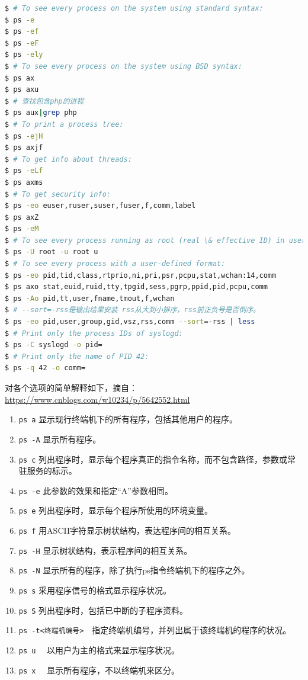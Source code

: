 \documentclass[doctor,openright,twoside]{sjtuthesis}
\providecommand{\tightlist}{%
    \setlength{\itemsep}{0pt}\setlength{\parskip}{0pt}}
\newcommand{\passthrough}[1]{#1}
\theoremstyle{plain}
\theoremstyle{definition}
\theoremstyle{remark}
\theoremstyle{ocrenumbox}
\theoremstyle{plain}
\begin{document}
\begin{lstlisting}[language=bash]
$ # To see every process on the system using standard syntax:
$ ps -e
$ ps -ef
$ ps -eF
$ ps -ely
$ # To see every process on the system using BSD syntax:
$ ps ax
$ ps axu
$ # 查找包含php的进程
$ ps aux|grep php
$ # To print a process tree:
$ ps -ejH
$ ps axjf
$ # To get info about threads:
$ ps -eLf
$ ps axms
$ # To get security info:
$ ps -eo euser,ruser,suser,fuser,f,comm,label
$ ps axZ
$ ps -eM
$ # To see every process running as root (real \& effective ID) in user format:
$ ps -U root -u root u
$ # To see every process with a user-defined format:
$ ps -eo pid,tid,class,rtprio,ni,pri,psr,pcpu,stat,wchan:14,comm
$ ps axo stat,euid,ruid,tty,tpgid,sess,pgrp,ppid,pid,pcpu,comm
$ ps -Ao pid,tt,user,fname,tmout,f,wchan
$ # --sort=-rss是输出结果安装 rss从大到小排序，rss前正负号是否倒序。
$ ps -eo pid,user,group,gid,vsz,rss,comm --sort=-rss | less
$ # Print only the process IDs of syslogd:
$ ps -C syslogd -o pid=
$ # Print only the name of PID 42:
$ ps -q 42 -o comm=
\end{lstlisting}

对各个选项的简单解释如下，摘自：\url{https://www.cnblogs.com/w10234/p/5642552.html}

\begin{enumerate}
\def\labelenumi{\arabic{enumi}.}
\tightlist
\item
  \passthrough{\lstinline!ps a!}
  显示现行终端机下的所有程序，包括其他用户的程序。
\item
  \passthrough{\lstinline!ps -A!} 显示所有程序。
\item
  \passthrough{\lstinline!ps c!}
  列出程序时，显示每个程序真正的指令名称，而不包含路径，参数或常驻服务的标示。
\item
  \passthrough{\lstinline!ps -e!} 此参数的效果和指定``A''参数相同。
\item
  \passthrough{\lstinline!ps e!}
  列出程序时，显示每个程序所使用的环境变量。
\item
  \passthrough{\lstinline!ps f!}
  用ASCII字符显示树状结构，表达程序间的相互关系。
\item
  \passthrough{\lstinline!ps -H!} 显示树状结构，表示程序间的相互关系。
\item
  \passthrough{\lstinline!ps -N!}
  显示所有的程序，除了执行ps指令终端机下的程序之外。
\item
  \passthrough{\lstinline!ps s!} 采用程序信号的格式显示程序状况。
\item
  \passthrough{\lstinline!ps S!} 列出程序时，包括已中断的子程序资料。
\item
  \passthrough{\lstinline!ps -t<终端机编号>!}　指定终端机编号，并列出属于该终端机的程序的状况。
\item
  \passthrough{\lstinline!ps u!} 　以用户为主的格式来显示程序状况。
\item
  \passthrough{\lstinline!ps x!} 　显示所有程序，不以终端机来区分。
\end{enumerate}
\end{document}
